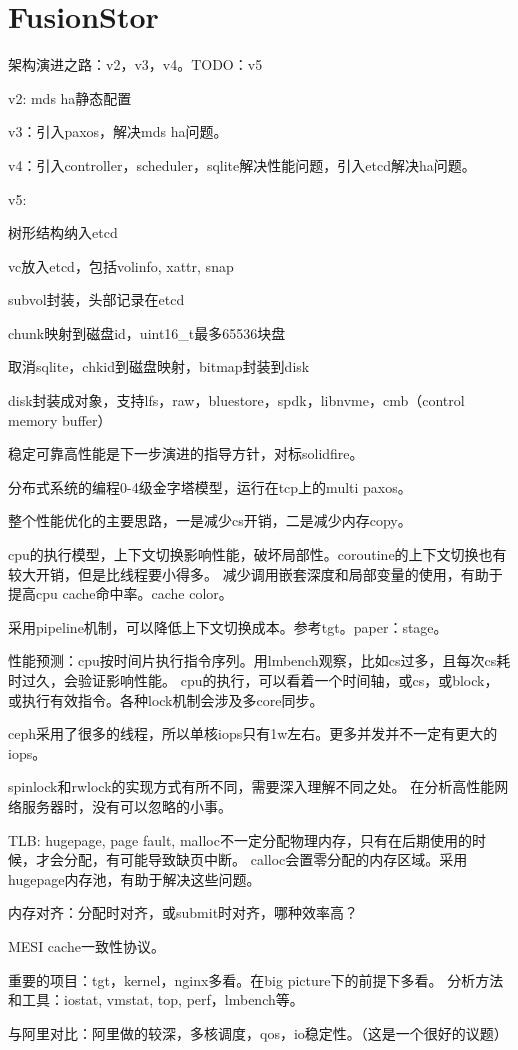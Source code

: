 \chapter{FusionStor}

架构演进之路：v2，v3，v4。TODO：v5

v2: mds ha静态配置

v3：引入paxos，解决mds ha问题。

v4：引入controller，scheduler，sqlite解决性能问题，引入etcd解决ha问题。

v5:
\begin{compactenum}
\item 树形结构纳入etcd
\item vc放入etcd，包括volinfo, xattr, snap
\item subvol封装，头部记录在etcd
\item chunk映射到磁盘id，uint16_t最多65536块盘
\item 取消sqlite，chkid到磁盘映射，bitmap封装到disk
\item disk封装成对象，支持lfs，raw，bluestore，spdk，libnvme，cmb（control memory buffer）
\end{compactenum}

稳定可靠高性能是下一步演进的指导方针，对标solidfire。

分布式系统的编程0-4级金字塔模型，运行在tcp上的multi paxos。

整个性能优化的主要思路，一是减少cs开销，二是减少内存copy。

cpu的执行模型，上下文切换影响性能，破坏局部性。coroutine的上下文切换也有较大开销，但是比线程要小得多。
减少调用嵌套深度和局部变量的使用，有助于提高cpu cache命中率。cache color。

采用pipeline机制，可以降低上下文切换成本。参考tgt。paper：stage。

性能预测：cpu按时间片执行指令序列。用lmbench观察，比如cs过多，且每次cs耗时过久，会验证影响性能。
cpu的执行，可以看着一个时间轴，或cs，或block，或执行有效指令。各种lock机制会涉及多core同步。

ceph采用了很多的线程，所以单核iops只有1w左右。更多并发并不一定有更大的iops。

spinlock和rwlock的实现方式有所不同，需要深入理解不同之处。
在分析高性能网络服务器时，没有可以忽略的小事。

TLB: hugepage, page fault, malloc不一定分配物理内存，只有在后期使用的时候，才会分配，有可能导致缺页中断。
calloc会置零分配的内存区域。采用hugepage内存池，有助于解决这些问题。

内存对齐：分配时对齐，或submit时对齐，哪种效率高？

MESI cache一致性协议。

重要的项目：tgt，kernel，nginx多看。在big picture下的前提下多看。
分析方法和工具：iostat, vmstat, top, perf，lmbench等。

与阿里对比：阿里做的较深，多核调度，qos，io稳定性。（这是一个很好的议题）
